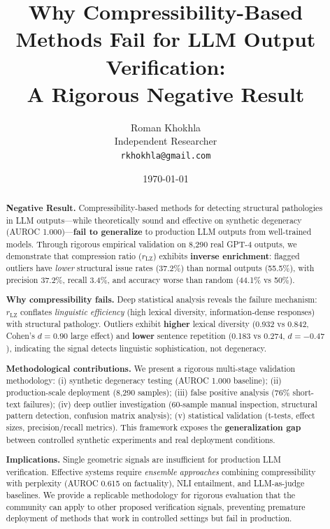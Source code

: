 \documentclass[11pt]{article}
\title{Why Compressibility-Based Methods Fail for LLM Output Verification:\\
\textbf{A Rigorous Negative Result}}
\author{
  Roman Khokhla\\
  Independent Researcher\\
  \texttt{rkhokhla@gmail.com}
}
\date{\today}
\begin{document}
\maketitle

\begin{abstract}
\textbf{Negative Result.} Compressibility-based methods for detecting structural pathologies in LLM outputs---while theoretically sound and effective on synthetic degeneracy (AUROC 1.000)---\textbf{fail to generalize} to production LLM outputs from well-trained models. Through rigorous empirical validation on 8,290 real GPT-4 outputs, we demonstrate that compression ratio ($r_{\text{LZ}}$) exhibits \textbf{inverse enrichment}: flagged outliers have \textit{lower} structural issue rates (37.2\%) than normal outputs (55.5\%), with precision 37.2\%, recall 3.4\%, and accuracy worse than random (44.1\% vs 50\%).

\textbf{Why compressibility fails.} Deep statistical analysis reveals the failure mechanism: $r_{\text{LZ}}$ conflates \textit{linguistic efficiency} (high lexical diversity, information-dense responses) with structural pathology. Outliers exhibit \textbf{higher} lexical diversity (0.932 vs 0.842, Cohen's $d=0.90$ large effect) and \textbf{lower} sentence repetition (0.183 vs 0.274, $d=-0.47$), indicating the signal detects linguistic sophistication, not degeneracy.

\textbf{Methodological contributions.} We present a rigorous multi-stage validation methodology: (i) synthetic degeneracy testing (AUROC 1.000 baseline); (ii) production-scale deployment (8,290 samples); (iii) false positive analysis (76\% short-text failures); (iv) deep outlier investigation (60-sample manual inspection, structural pattern detection, confusion matrix analysis); (v) statistical validation (t-tests, effect sizes, precision/recall metrics). This framework exposes the \textbf{generalization gap} between controlled synthetic experiments and real deployment conditions.

\textbf{Implications.} Single geometric signals are insufficient for production LLM verification. Effective systems require \textit{ensemble approaches} combining compressibility with perplexity (AUROC 0.615 on factuality), NLI entailment, and LLM-as-judge baselines. We provide a replicable methodology for rigorous evaluation that the community can apply to other proposed verification signals, preventing premature deployment of methods that work in controlled settings but fail in production.
\end{abstract}
\end{document}
